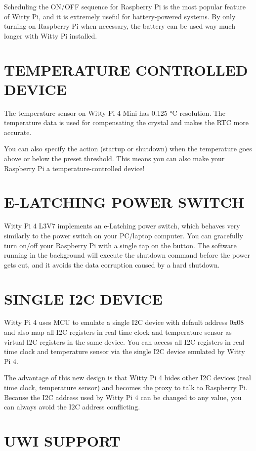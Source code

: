 \documentclass{article}\usepackage[]{graphicx}\usepackage[]{xcolor}
\begin{document}
Scheduling the ON/OFF sequence for Raspberry Pi is the most popular feature of Witty Pi, and it is extremely useful for battery-powered systems. By only turning on Raspberry Pi when necessary, the battery can be used way much longer with Witty Pi installed.

\section{TEMPERATURE CONTROLLED DEVICE}

The temperature sensor on Witty Pi 4 Mini has 0.125 °C resolution. The temperature data is used for compensating the crystal and makes the RTC more accurate.

You can also specify the action (startup or shutdown) when the temperature goes above or below the preset threshold. This means you can also make your Raspberry Pi a temperature-controlled device!

\section{E-LATCHING POWER SWITCH}

Witty Pi 4 L3V7 implements an e-Latching power switch, which behaves very similarly to the power switch on your PC/laptop computer. You can gracefully turn on/off your Raspberry Pi with a single tap on the button. The software running in the background will execute the shutdown command before the power gets cut, and it avoids the data corruption caused by a hard shutdown.

\section{SINGLE I2C DEVICE}

Witty Pi 4 uses MCU to emulate a single I2C device with default address 0x08 and also map all I2C registers in real time clock and temperature sensor as virtual I2C registers in the same device. You can access all I2C registers in real time clock and temperature sensor via the single I2C device emulated by Witty Pi 4.

The advantage of this new design is that Witty Pi 4 hides other I2C devices (real time clock, temperature sensor) and becomes the proxy to talk to Raspberry Pi. Because the I2C address used by Witty Pi 4 can be changed to any value, you can always avoid the I2C address conflicting.

\section{UWI SUPPORT}
\end{document}
